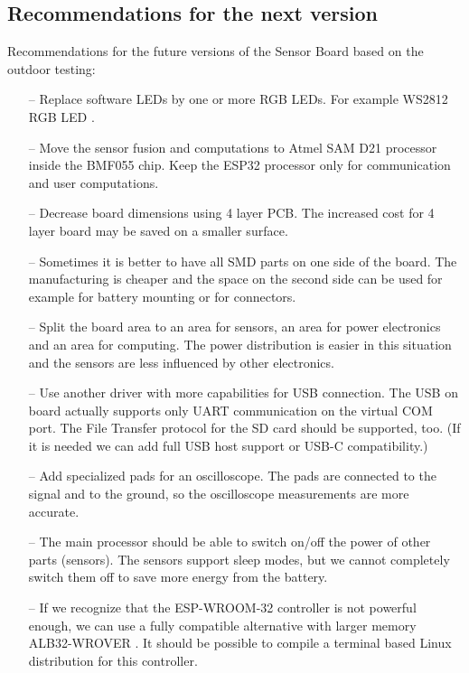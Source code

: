 \subsection{Recommendations for the next version}
\label{recommendationsNextVerison}
Recommendations for the future versions of the Sensor Board based on the outdoor testing:
\begin{itemize}
	\item[--] Replace software LEDs by one or more RGB LEDs. For example WS2812 RGB LED \cite{worldsemi:WS2812}.
	\item[--] Move the sensor fusion and computations to Atmel SAM D21 \cite{atmel:samd20} processor inside the BMF055 \cite{bosch:BMF055} chip. Keep the ESP32 \cite{espressif:ESP-WROOM-32} processor only for communication and user computations.
	\item[--] Decrease board dimensions using 4 layer \ac{PCB}. The increased cost for 4 layer board may be saved on a smaller surface.
	\item[--] Sometimes it is better to have all \ac{SMD} parts on one side of the board. The manufacturing is cheaper and the space on the second side can be used for example for battery mounting or for connectors.
	\item[--] Split the board area to an area for sensors, an area for power electronics and an area for computing. The power distribution is easier in this situation and the sensors are less influenced by other electronics.
	\item[--] Use another driver with more capabilities for USB connection. The USB on board actually supports only UART communication on the virtual COM port. The File Transfer protocol for the SD card should be supported, too. (If it is needed we can add full USB host support or USB-C compatibility.)
	\item[--] Add specialized pads for an oscilloscope. The pads are connected to the signal and to the ground, so the oscilloscope measurements are more accurate.
	\item[--] The main processor should be able to switch on/off the power of other parts (sensors). The sensors support sleep modes, but we cannot completely switch them off to save more energy from the battery.
	\item[--] If we recognize that the ESP-WROOM-32 controller is not powerful enough, we can use a fully compatible alternative with larger memory ALB32-WROVER \cite{ALB32-WROVER}. It should be possible to compile a terminal based Linux distribution for this controller.
\end{itemize}

